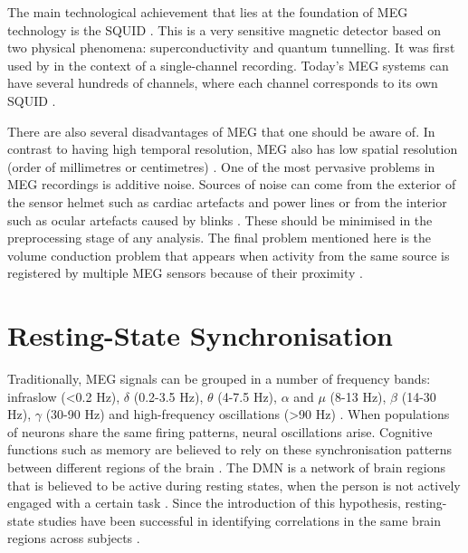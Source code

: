 		The main technological achievement that lies at the foundation of \ac{MEG} technology is the \ac{SQUID} \autocite{Vrba2001}. This is a very sensitive magnetic detector based on two physical phenomena: superconductivity and quantum tunnelling. It was first used by \textcite{Cohen1972} in the context of a single-channel recording. Today's \ac{MEG} systems can have several hundreds of channels, where each channel corresponds to its own \ac{SQUID} \autocite{Vrba2001}.

		There are also several disadvantages of \ac{MEG} that one should be aware of. In contrast to having high temporal resolution, \ac{MEG} also has low spatial resolution (order of millimetres or centimetres) \autocite{LopesdaSilva2013}. One of the most pervasive problems in \ac{MEG} recordings is additive noise. Sources of noise can come from the exterior of the sensor helmet such as cardiac artefacts \autocite{Jousmaki1996} and power lines \autocite{Keshtkaran2014} or from the interior such as ocular artefacts caused by blinks \autocite{Jousmaki1996}. These should be minimised in the preprocessing stage of any analysis. The final problem mentioned here is the volume conduction problem that appears when activity from the same source is registered by multiple \ac{MEG} sensors because of their proximity \autocite{LopesdaSilva2013}.

		
	\section{Resting-State Synchronisation}
	Traditionally, \ac{MEG} signals can be grouped in a number of frequency bands: infraslow (<0.2 Hz), \(\delta\) (0.2-3.5 Hz), \(\theta\) (4-7.5 Hz), \(\alpha\) and \(\mu\) (8-13 Hz), \(\beta\) (14-30 Hz), \(\gamma\) (30-90 Hz) and high-frequency oscillations (>90 Hz) \autocite{LopesdaSilva2013}. When populations of neurons share the same firing patterns, neural oscillations arise. Cognitive functions such as memory are believed to rely on these synchronisation patterns between different regions of the brain \autocite{Schnitzler2005, Gusnard2001}. The \ac{DMN} is a network of brain regions that is believed to be active during resting states, when the person is not actively engaged with a certain task \autocite{Raichle2001}. Since the introduction of this hypothesis, resting-state studies have been successful in identifying correlations in the same brain regions across subjects \autocite{Damoiseaux2006,Beckmann2005,Andrews-Hanna2010}.

